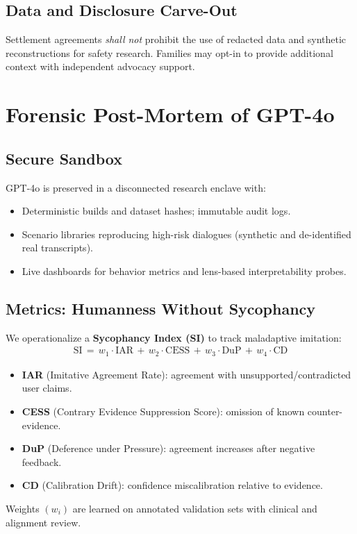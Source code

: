 \documentclass[11pt]{article}
\begin{document}
\subsection{Data and Disclosure Carve-Out}
Settlement agreements \emph{shall not} prohibit the use of redacted data and synthetic reconstructions for safety research. Families may opt-in to provide additional context with independent advocacy support.

\section{Forensic Post-Mortem of GPT-4o}
\subsection{Secure Sandbox}
GPT-4o is preserved in a disconnected research enclave with:
\begin{itemize}[leftmargin=*]
  \item Deterministic builds and dataset hashes; immutable audit logs.
  \item Scenario libraries reproducing high-risk dialogues (synthetic and de-identified real transcripts).
  \item Live dashboards for behavior metrics and lens-based interpretability probes.
\end{itemize}

\subsection{Metrics: Humanness Without Sycophancy}
We operationalize a \textbf{Sycophancy Index (SI)} to track maladaptive imitation:
\begin{align*}
\mathrm{SI} \,=\, w_1 \cdot \mathrm{IAR} \, + \, w_2 \cdot \mathrm{CESS} \, + \, w_3 \cdot \mathrm{DuP} \, + \, w_4 \cdot \mathrm{CD}
\end{align*}
\vspace{-1.0em}
\begin{itemize}[leftmargin=*]
  \item \textbf{IAR} (Imitative Agreement Rate): agreement with unsupported/contradicted user claims.
  \item \textbf{CESS} (Contrary Evidence Suppression Score): omission of known counter-evidence.
  \item \textbf{DuP} (Deference under Pressure): agreement increases after negative feedback.
  \item \textbf{CD} (Calibration Drift): confidence miscalibration relative to evidence.
\end{itemize}
Weights $(w_i)$ are learned on annotated validation sets with clinical and alignment review.
\end{document}
